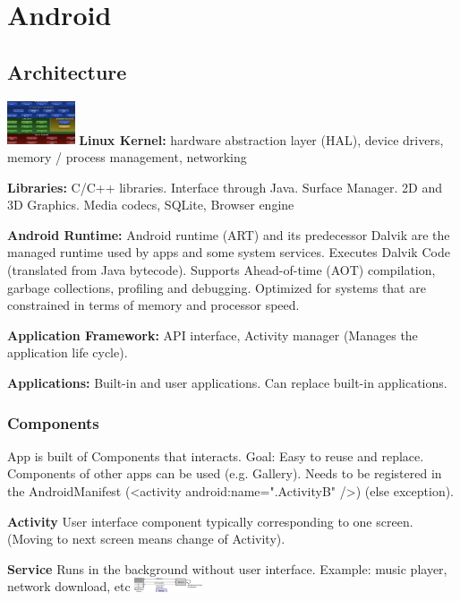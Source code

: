 \section{Android}

\subsection{Architecture}
\includegraphics[width=0.15\textwidth]{android/architecture.png}
\textbf{Linux Kernel:} hardware abstraction layer (HAL), device drivers, memory
/ process management, networking

\textbf{Libraries:} C/C++ libraries. Interface through Java. Surface Manager.
2D and 3D Graphics. Media codecs, SQLite, Browser engine

\textbf{Android Runtime:}
Android runtime (ART) and its predecessor Dalvik are the managed runtime used
by apps and some system services.
Executes Dalvik Code (translated from Java bytecode).
Supports Ahead-of-time (AOT) compilation, garbage collections, profiling and
debugging.
Optimized for systems that are constrained in terms of memory and processor
speed.

\textbf{Application Framework:}
API interface, Activity manager (Manages the application life cycle).

\textbf{Applications:}
Built-in and user applications. Can replace built-in applications.

\subsubsection{Components}
App is built of Components that interacts. Goal: Easy to reuse and replace.
Components of other apps can be used (e.g. Gallery). Needs to be registered in
the AndroidManifest (<activity android:name=".ActivityB" />) (else exception).

\textbf{Activity}
User interface component typically corresponding to one screen. (Moving to next
screen means change of Activity).

\textbf{Service}
Runs in the background without user interface.
Example: music player, network download, etc
\includegraphics[width=0.15\textwidth]{android/service_example.png}

